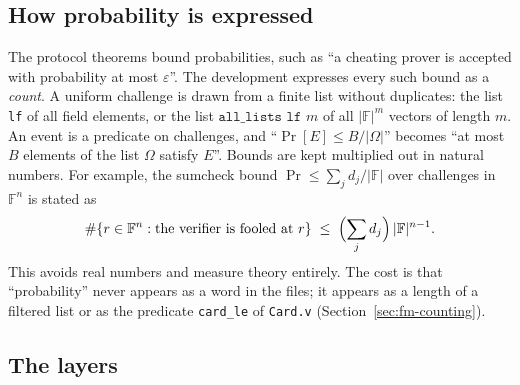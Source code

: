 \documentclass[11pt,a4paper]{article}
\newcommand{\F}{\mathbb{F}}
\theoremstyle{definition}
\theoremstyle{plain}
\begin{document}
\subsection{How probability is expressed}

The protocol theorems bound probabilities, such as ``a cheating prover is accepted with probability
at most $\varepsilon$''. The development expresses every such bound as a \emph{count}. A uniform
challenge is drawn from a finite list without duplicates: the list \texttt{lf} of all field
elements, or the list $\texttt{all\_lists lf } m$ of all $|\F|^m$ vectors of length $m$. An event is
a predicate on challenges, and ``$\Pr[E]\le B/|\Omega|$'' becomes ``at most $B$ elements of the
list $\Omega$ satisfy $E$''. Bounds are kept multiplied out in natural numbers. For example, the
sumcheck bound $\Pr\le\sum_j d_j/|\F|$ over challenges in $\F^n$ is stated as
\[
  \#\{r\in\F^n : \text{the verifier is fooled at } r\}\;\le\;\Bigl(\sum_j d_j\Bigr)\,|\F|^{n-1}.
\]
This avoids real numbers and measure theory entirely. The cost is that ``probability'' never
appears as a word in the files; it appears as a length of a filtered list or as the predicate
\texttt{card\_le} of \texttt{Card.v} (Section~\ref{sec:fm-counting}).

\subsection{The layers}
\end{document}
